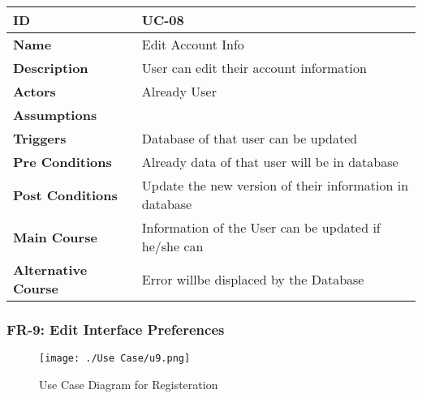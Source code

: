     \begin{center}
        \begin{tabularx}{\textwidth}{|l|X|}
            \hline
            \textbf{ID} & UC-08 \\
            \hline
            \textbf{Name} & Edit Account Info \\
            \hline
            \textbf{Description} & User can edit their account information \\
            \hline
            \textbf{Actors} & Already User \\
            \hline
            \textbf{Assumptions} &  \\
            \hline
            \textbf{Triggers} & Database of that user can be updated \\
            \hline
            \textbf{Pre Conditions} & Already data of that user will be in database  \\
            \hline
            \textbf{Post Conditions} & Update the new version of their information in database \\
            \hline
            \textbf{Main Course} & Information of the User can be updated if he/she can \\
            \hline
            \textbf{Alternative Course} & Error willbe displaced by the Database \\
            \hline
            
        \end{tabularx}
    \end{center}
    \newpage 
    

    \subsubsection{FR-9: Edit Interface Preferences}
    \begin{figure}[H]
        \texttt{[image: ./Use Case/u9.png]}
        \centering 
        \caption{Use Case Diagram for Registeration}
        \label{fig:prototype1}
        \end{figure}
        

